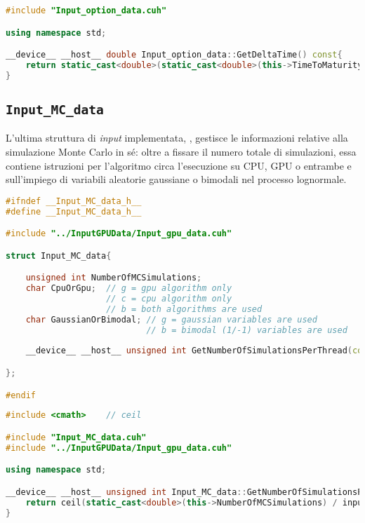 \begin{lstlisting}[language=C++, caption={\texttt{libraries/InputStructures/InputOptionData/Input\_option\_data.cu}}]
#include "Input_option_data.cuh"

using namespace std;

__device__ __host__ double Input_option_data::GetDeltaTime() const{
	return static_cast<double>(static_cast<double>(this->TimeToMaturity) / static_cast<unsigned int>(this->NumberOfIntervals));	
}
\end{lstlisting}

\subsection{\texttt{Input\_MC\_data}}
L'ultima struttura di \textit{input} implementata, , gestisce le informazioni relative alla simulazione Monte Carlo in sé: oltre a fissare il numero totale di simulazioni, essa contiene istruzioni per l'algoritmo circa l'esecuzione su CPU, GPU o entrambe e sull'impiego di variabili aleatorie gaussiane o bimodali nel processo lognormale.

\begin{lstlisting}[language=C++, caption={\texttt{libraries/InputStructures/InputMCData/Input\_MC\_data.cuh}}]
#ifndef __Input_MC_data_h__
#define __Input_MC_data_h__

#include "../InputGPUData/Input_gpu_data.cuh"

struct Input_MC_data{

	unsigned int NumberOfMCSimulations;
	char CpuOrGpu;	// g = gpu algorithm only
					// c = cpu algorithm only
					// b = both algorithms are used
	char GaussianOrBimodal;	// g = gaussian variables are used
							// b = bimodal (1/-1) variables are used
	
	__device__ __host__ unsigned int GetNumberOfSimulationsPerThread(const Input_gpu_data&) const;

};

#endif
\end{lstlisting}

\begin{lstlisting}[language=C++, caption={\texttt{libraries/InputStructures/InputMCData/Input\_MC\_data.cu}}]
#include <cmath>	// ceil

#include "Input_MC_data.cuh"
#include "../InputGPUData/Input_gpu_data.cuh"

using namespace std;

__device__ __host__ unsigned int Input_MC_data::GetNumberOfSimulationsPerThread(const Input_gpu_data& inputGPU) const{
	return ceil(static_cast<double>(this->NumberOfMCSimulations) / inputGPU.GetTotalNumberOfThreads());
}
\end{lstlisting}

